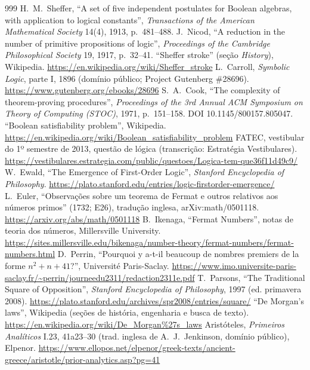 \begin{thebibliography}{999}
 H.~M.~Sheffer, \enquote{A set of five independent postulates for Boolean algebras, with application to logical constants}, \emph{Transactions of the American Mathematical Society} 14(4), 1913, p.~481--488.
 J.~Nicod, \enquote{A reduction in the number of primitive propositions of logic}, \emph{Proceedings of the Cambridge Philosophical Society} 19, 1917, p.~32--41.
 \enquote{Sheffer stroke} (seção \emph{History}), Wikipedia. \url{https://en.wikipedia.org/wiki/Sheffer_stroke}
 L.~Carroll, \emph{Symbolic Logic}, parte I, 1896 (domínio público; Project Gutenberg \#28696). \url{https://www.gutenberg.org/ebooks/28696}
 S.~A.~Cook, \enquote{The complexity of theorem-proving procedures}, \emph{Proceedings of the 3rd Annual ACM Symposium on Theory of Computing (STOC)}, 1971, p.~151--158. DOI 10.1145/800157.805047.
 \enquote{Boolean satisfiability problem}, Wikipedia. \url{https://en.wikipedia.org/wiki/Boolean_satisfiability_problem}
 FATEC, vestibular do 1º semestre de 2013, questão de lógica (transcrição: Estratégia Vestibulares). \url{https://vestibulares.estrategia.com/public/questoes/Logica-tem-que36f11d49c9/}
 W.~Ewald, \enquote{The Emergence of First-Order Logic}, \emph{Stanford Encyclopedia of Philosophy}. \url{https://plato.stanford.edu/entries/logic-firstorder-emergence/}
 L.~Euler, \enquote{Observações sobre um teorema de Fermat e outros relativos aos números primos} (1732; E26), tradução inglesa, arXiv:math/0501118. \url{https://arxiv.org/abs/math/0501118}
 B.~Ikenaga, \enquote{Fermat Numbers}, notas de teoria dos números, Millersville University. \url{https://sites.millersville.edu/bikenaga/number-theory/fermat-numbers/fermat-numbers.html}
 D.~Perrin, \enquote{Pourquoi y a-t-il beaucoup de nombres premiers de la forme $n^2+n+41$?}, Université Paris-Saclay. \url{https://www.imo.universite-paris-saclay.fr/~perrin/journeedu2311/redaction2311e.pdf}
 T.~Parsons, \enquote{The Traditional Square of Opposition}, \emph{Stanford Encyclopedia of Philosophy}, 1997 (ed. primavera 2008). \url{https://plato.stanford.edu/archives/spr2008/entries/square/}
 \enquote{De Morgan's laws}, Wikipedia (seções de história, engenharia e busca de texto). \url{https://en.wikipedia.org/wiki/De_Morgan\%27s_laws}
 Aristóteles, \emph{Primeiros Analíticos} I.23, 41a23--30 (trad. inglesa de A.~J.~Jenkinson, domínio público), Elpenor. \url{https://www.ellopos.net/elpenor/greek-texts/ancient-greece/aristotle/prior-analytics.asp?pg=41}

\end{thebibliography}
